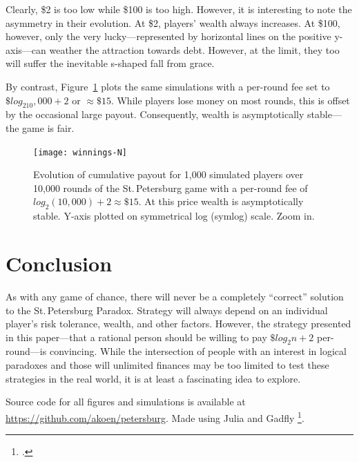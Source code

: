 \documentclass[11pt]{article}
\begin{document}
Clearly, \$2 is too low while \$100 is too high. However, it is interesting to note the asymmetry in their evolution. At \$2, players' wealth always increases. At \$100, however, only the very lucky---represented by horizontal lines on the positive y-axis---can weather the attraction towards debt. However, at the limit, they too will suffer the inevitable s-shaped fall from grace.

By contrast, Figure~\ref{fig:evolution-fair} plots the same simulations with a per-round fee set to $\$log_210,000+2$ or $\approx\$15$. While players lose money on most rounds, this is offset by the occasional large payout. Consequently, wealth is asymptotically stable---the game is fair.

\begin{figure}
  \centering
  \texttt{[image: winnings-N]}
  \caption{Evolution of cumulative payout for 1,000 simulated players over 10,000 rounds of the St.\,Petersburg game with a per-round fee of $log_2(10,000)+2\approx\$15$. At this price wealth is asymptotically stable. Y-axis plotted on symmetrical log (symlog) scale. Zoom in.} \label{fig:evolution-fair}
\end{figure}

\clearpage
\section{Conclusion}

As with any game of chance, there will never be a completely ``correct'' solution to the St.\,Petersburg Paradox. Strategy will always depend on an individual player's risk tolerance, wealth, and other factors. However, the strategy presented in this paper---that a rational person should be willing to pay $\$log_2n+2$ per-round---is convincing. While the intersection of people with an interest in logical paradoxes and those will unlimited finances may be too limited to test these strategies in the real world, it is at least a fascinating idea to explore.


Source code for all figures and simulations is available at \url{https://github.com/akoen/petersburg}. Made using Julia and Gadfly \footcite{daniel_c_jones_2021_5559613}.
\clearpage
\printbibliography
\end{document}
